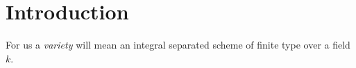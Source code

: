 \section*{Introduction}


\vspace{3cm}

For us a \emph{variety} will mean an integral separated scheme of finite type over a field $k$. 